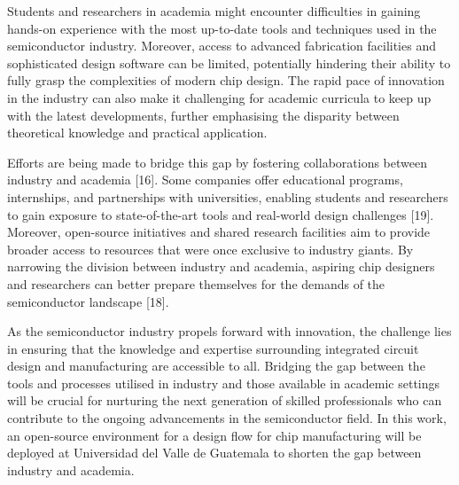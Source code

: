 Students and researchers in academia might encounter difficulties in gaining hands-on experience with the most up-to-date tools and techniques used in the semiconductor industry. Moreover, access to advanced fabrication facilities and sophisticated design software can be limited, potentially hindering their ability to fully grasp the complexities of modern chip design. The rapid pace of innovation in the industry can also make it challenging for academic curricula to keep up with the latest developments, further emphasising the disparity between theoretical knowledge and practical application.

Efforts are being made to bridge this gap by fostering collaborations between industry and academia [16]. Some companies offer educational programs, internships, and partnerships with universities, enabling students and researchers to gain exposure to state-of-the-art tools and real-world design challenges [19]. Moreover, open-source initiatives and shared research facilities aim to provide broader access to resources that were once exclusive to industry giants. By narrowing the division between industry and academia, aspiring chip designers and researchers can better prepare themselves for the demands of the semiconductor landscape [18].

As the semiconductor industry propels forward with innovation, the challenge lies in ensuring that the knowledge and expertise surrounding integrated circuit design and manufacturing are accessible to all. Bridging the gap between the tools and processes utilised in industry and those available in academic settings will be crucial for nurturing the next generation of skilled professionals who can contribute to the ongoing advancements in the semiconductor field. In this work, an open-source environment for a design flow for chip manufacturing will be deployed at  Universidad del Valle de Guatemala to shorten the gap between industry and academia. 